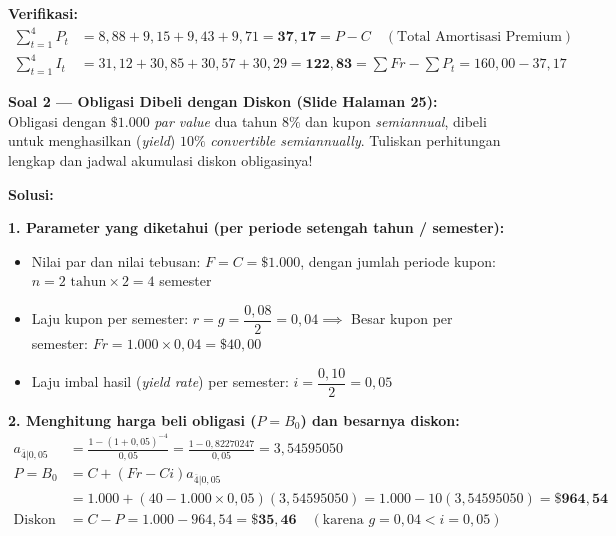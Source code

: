 \documentclass[10.5pt,a4paper]{article}
\begin{document}
\textbf{Verifikasi:}
\begin{align*}
    \sum_{t=1}^4 P_t &= 8{,}88 + 9{,}15 + 9{,}43 + 9{,}71 = \mathbf{37{,}17} = P - C \quad (\text{Total Amortisasi Premium}) \\
    \sum_{t=1}^4 I_t &= 31{,}12 + 30{,}85 + 30{,}57 + 30{,}29 = \mathbf{122{,}83} = \sum Fr - \sum P_t = 160{,}00 - 37{,}17
\end{align*}

\newpage

\begin{tcolorbox}
\textbf{Soal 2 --- Obligasi Dibeli dengan Diskon (Slide Halaman 25):}\\
Obligasi dengan $\$1.000$ \textit{par value} dua tahun $8\%$ dan kupon \textit{semiannual}, dibeli untuk menghasilkan (\textit{yield}) $10\%$ \textit{convertible semiannually}. Tuliskan perhitungan lengkap dan jadwal akumulasi diskon obligasinya!
\end{tcolorbox}

\textbf{Solusi:}

\textbf{1. Parameter yang diketahui (per periode setengah tahun / semester):}
\begin{itemize}[leftmargin=1.5em, topsep=0pt, itemsep=0pt]
    \item Nilai par dan nilai tebusan: $F = C = \$1.000$, dengan jumlah periode kupon: $n = 2 \text{ tahun} \times 2 = 4$ semester
    \item Laju kupon per semester: $r = g = \dfrac{0{,}08}{2} = 0{,}04 \implies$ Besar kupon per semester: $Fr = 1.000 \times 0{,}04 = \$40{,}00$
    \item Laju imbal hasil (\textit{yield rate}) per semester: $i = \dfrac{0{,}10}{2} = 0{,}05$
\end{itemize}

\textbf{2. Menghitung harga beli obligasi ($P = B_0$) dan besarnya diskon:}
\begin{align*}
    a_{\overline{4}|0{,}05} &= \frac{1 - (1 + 0{,}05)^{-4}}{0{,}05} = \frac{1 - 0{,}82270247}{0{,}05} = 3{,}54595050 \\[0.2em]
    P = B_0 &= C + (Fr - Ci) a_{\overline{4}|0{,}05} \\
    &= 1.000 + (40 - 1.000 \times 0{,}05)(3{,}54595050) = 1.000 - 10(3{,}54595050) = \mathbf{\$964{,}54} \\
    \text{Diskon} &= C - P = 1.000 - 964{,}54 = \mathbf{\$35{,}46} \quad (\text{karena } g = 0{,}04 < i = 0{,}05)
\end{align*}
\end{document}
